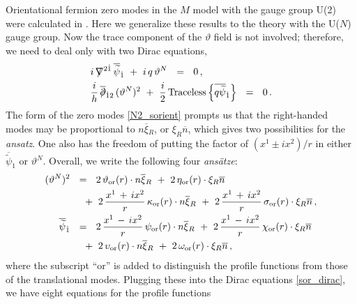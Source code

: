 \documentclass[12pt]{article}
\newcommand{\p}{\partial}
\newcommand{\wt}{\widetilde}
\newcommand{\ov}{\overline}
\def\slashed#1{\setbox0=\hbox{$#1$}             %
   \dimen0=\wd0                                 %
   \setbox1=\hbox{/} \dimen1=\wd1               %
   \ifdim\dimen0>\dimen1                        %
      \rlap{\hbox to \dimen0{\hfil/\hfil}}      %
      #1                                        %
   \else                                        %
      \rlap{\hbox to \dimen1{\hfil$#1$\hfil}}   %
      /                                         %
   \fi}                                        %
\newcommand{\bxir}{\ov{\xi}{}_R}
\newcommand{\xir}{\xi_R}
\newcommand{\nbar}{\ov{n}}
\newcommand{\tor}{\vartheta_{\rm or}}
\newcommand{\eor}{\eta_{\rm or}}
\newcommand{\kor}{\kappa_{\rm or}}
\newcommand{\sor}{\sigma_{\rm or}}
\newcommand{\por}{\psi_{\rm or}}
\newcommand{\cor}{\chi_{\rm or}}
\newcommand{\uor}{\upsilon_{\rm or}}
\newcommand{\oor}{\omega_{\rm or}}
\begin{document}
Orientational fermion zero modes in the $M$ model with the gauge group U(2) were calculated in
\cite{GSYmmodel}. Here we generalize these results to the theory with the U($N$) gauge group.	
Now the trace component of the $ \vartheta $ field  is not involved; therefore, we
	need to deal only with two Dirac equations,
\begin{align}
\label{sor_dirac}
%
&
\notag
	i\, \slashed{\nabla}^{2\dot{1}}\, \ov{\wt\psi}{}_{\dot 1}  
		~+~  i\, q\, \vartheta^N  ~~=~~ 0\,, \\
%
&
	\frac{i}{h}\, \ov{\slashed{\p}}{}_{\dot{1}2}\, (\vartheta^N)^2
		~+~ \frac{i}{2}\, {\rm Traceless} \left\{ \ov{q \wt{\psi}}{}_{\dot 1} \right\} ~~=~~ 0\,.
\end{align}
	The form of the zero modes \eqref{N2_sorient} prompts  us that the right-handed modes may be proportional
	to $ n\bxir $, or $ \xir\nbar $, which gives two possibilities for the {\it ansatz}.
	One also has the freedom of putting the factor of $ (x^1 \pm ix^2)/r $ in either 
	$ \ov{\wt \psi}{}_{\dot 1} $ or  $ \vartheta^N $.
	Overall, we write the following four {\it ans\"atze}:
\begin{align*}
%
	(\vartheta^N)^2  & ~~=~~ 2\,\tor(r)\cdot n\bxir ~+~  2\,\eor(r) \cdot \xir \nbar \\
			& \quad
			~+~ 2\,\frac{x^1\,+\,ix^2}{r}\, \kor(r) \cdot n\bxir 
			~+~ 2\,\frac{x^1\,+\,ix^2}{r}\, \sor(r) \cdot \xir\nbar \,,\\
%	
	\ov{\wt{\psi}}{}_{\dot 1} & ~~=~~ 2\, \frac{x^1\,-\,ix^2}{r}\, \por(r)\cdot n\bxir 
				      ~+~ 2\, \frac{x^1\,-\,ix^2}{r}\, \cor(r)\cdot \xir\nbar \\
				& \quad
				          ~+~ 2\, \uor(r)\cdot n\bxir
					  ~+~ 2\, \oor(r)\cdot \xir\nbar\,,
\end{align*}
	where the subscript ``or'' is added to distinguish the profile
	functions from those of the translational modes. 
	Plugging these into the Dirac equations \eqref{sor_dirac}, we have eight equations for the profile
	functions
\end{document}
